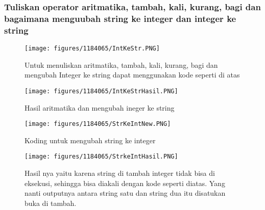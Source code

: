 \subsubsection{Tuliskan operator aritmatika, tambah, kali, kurang, bagi dan bagaimana menguubah string ke integer dan integer ke string}
\begin{figure}[H]
		\texttt{[image: figures/1184065/IntKeStr.PNG]}
		\centering
		\caption{Untuk menuliskan aritmatika, tambah, kali, kurang, bagi dan mengubah Integer ke string dapat menggunakan kode seperti di atas}
\end{figure}
\begin{figure}[H]
		\texttt{[image: figures/1184065/IntKeStrHasil.PNG]}
		\centering
		\caption{Hasil aritmatika dan mengubah ineger ke string}
\end{figure}
\begin{figure}[H]
		\texttt{[image: figures/1184065/StrKeIntNew.PNG]}
		\centering
		\caption{Koding untuk mengubah string ke integer}
\end{figure}
\begin{figure}[H]
		\texttt{[image: figures/1184065/StrkeIntHasil.PNG]}
		\centering
		\caption{Hasil nya yaitu karena string di tambah integer tidak bisa di eksekusi, sehingga bisa diakali dengan kode seperti diatas. Yang nanti outputnya antara string satu dan string dua itu disatukan buka di tambah.}
\end{figure}
